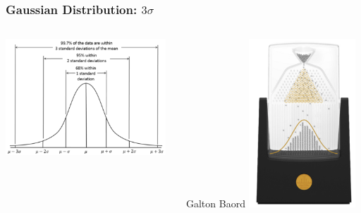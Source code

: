 \documentclass{beamer}
\begin{document}
\begin{frame}\frametitle{Gaussian Distribution: $3 \sigma$}
\begin{columns}
\begin{column}{6cm}
\begin{center}
\includegraphics[width=6cm]{fig/stat5.png}
\end{center}
\end{column}
\begin{column}{4cm}

\begin{center}
Galton Baord
\includegraphics[width=4cm]{fig/stat7.png}
\end{center}
\end{column}
\end{columns}
\end{frame}
\end{document}
